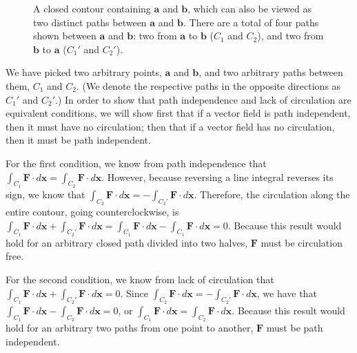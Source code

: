\documentclass{myarticle}
\renewcommand{\vec}[1]{\mathbf{#1}}
\theoremstyle{nospace}
\newtheorem{old series theorem}{Theorem}
\newenvironment{series theorem}{\begin{mdframed}\begin{old series theorem}}{\end{old series theorem}\end{mdframed}}
\begin{document}
\begin{figure}[htb!] \centering
{}
\caption{A closed contour containing $\vec{a}$ and $\vec{b}$, which can also be viewed as two distinct paths between $\vec{a}$ and $\vec{b}$. There are a total of four paths shown between $\vec{a}$ and $\vec{b}$: two from $\vec{a}$ to $\vec{b}$ ($C_1$ and $C_2$), and two from $\vec{b}$ to $\vec{a}$ ($C_1'$ and $C_2'$).}
\label{fig:no circulation}
\end{figure}

We have picked two arbitrary points, $\vec{a}$ and $\vec{b}$, and two arbitrary paths between them, $C_1$ and $C_2$. (We denote the respective paths in the opposite directions as $C_1'$ and $C_2'$.) In order to show that path independence and lack of circulation are equivalent conditions, we will show first that if a vector field is path independent, then it must have no circulation; then that if a vector field has no circulation, then it must be path independent.

For the first condition, we know from path independence that $\int_{C_1} \vec{F} \cdot d\vec{x} = \int_{C_2} \vec{F} \cdot d\vec{x}$. However, because reversing a line integral reverses its sign, we know that $\int_{C_2} \vec{F} \cdot d\vec{x} = -\int_{C_2'} \vec{F} \cdot d\vec{x}$. Therefore, the circulation along the entire contour, going counterclockwise, is $\int_{C_1} \vec{F} \cdot d\vec{x} + \int_{C_2'} \vec{F} \cdot d\vec{x} = \int_{C_1} \vec{F} \cdot d\vec{x} - \int_{C_1} \vec{F} \cdot d\vec{x} = 0$. Because this result would hold for an arbitrary closed path divided into two halves, $\vec{F}$ must be circulation free.

For the second condition, we know from lack of circulation that $\int_{C_1} \vec{F} \cdot d\vec{x} + \int_{C_2'} \vec{F} \cdot d\vec{x} = 0$. Since $\int_{C_2} \vec{F} \cdot d\vec{x} = -\int_{C_2'} \vec{F} \cdot d\vec{x}$, we have that $\int_{C_1} \vec{F} \cdot d\vec{x} - \int_{C_2} \vec{F} \cdot d\vec{x} = 0$, or $\int_{C_1} \vec{F} \cdot d\vec{x} = \int_{C_2} \vec{F} \cdot d\vec{x}$. Because this result would hold for an arbitrary two paths from one point to another, $\vec{F}$ must be path independent.
\end{document}
